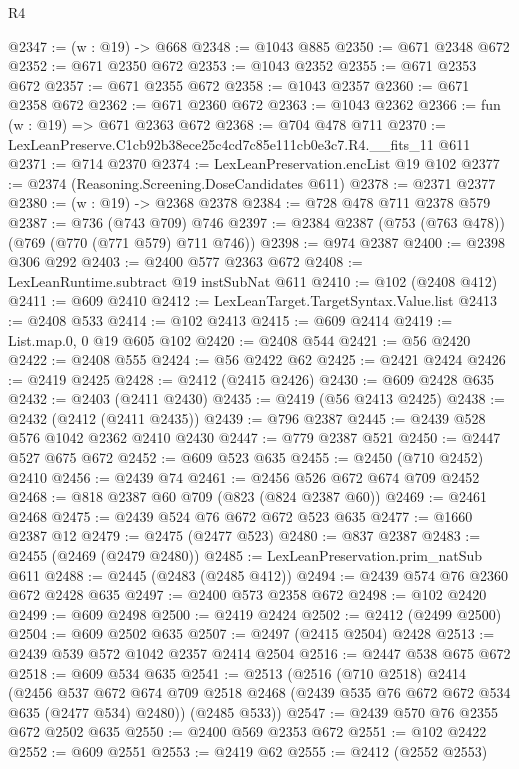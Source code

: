 \begin{lexlean}{R4}
\begin{coremodule}
@2347 := (w : @19) -> @668
@2348 := @1043 @885
@2350 := @671 @2348 @672
@2352 := @671 @2350 @672
@2353 := @1043 @2352
@2355 := @671 @2353 @672
@2357 := @671 @2355 @672
@2358 := @1043 @2357
@2360 := @671 @2358 @672
@2362 := @671 @2360 @672
@2363 := @1043 @2362
@2366 := fun (w : @19) => @671 @2363 @672
@2368 := @704 @478 @711
@2370 := LexLeanPreserve.C1cb92b38ece25c4cd7c85e111cb0e3c7.R4.__fits_11 @611
@2371 := @714 @2370
@2374 := LexLeanPreservation.encList @19 @102
@2377 := @2374 (Reasoning.Screening.DoseCandidates @611)
@2378 := @2371 @2377
@2380 := (w : @19) -> @2368 @2378
@2384 := @728 @478 @711 @2378 @579
@2387 := @736 (@743 @709) @746
@2397 := @2384 @2387 (@753 (@763 @478)) (@769 (@770 (@771 @579) @711 @746))
@2398 := @974 @2387
@2400 := @2398 @306 @292
@2403 := @2400 @577 @2363 @672
@2408 := LexLeanRuntime.subtract @19 instSubNat @611
@2410 := @102 (@2408 @412)
@2411 := @609 @2410
@2412 := LexLeanTarget.TargetSyntax.Value.list
@2413 := @2408 @533
@2414 := @102 @2413
@2415 := @609 @2414
@2419 := List.map.{0, 0} @19 @605 @102
@2420 := @2408 @544
@2421 := @56 @2420
@2422 := @2408 @555
@2424 := @56 @2422 @62
@2425 := @2421 @2424
@2426 := @2419 @2425
@2428 := @2412 (@2415 @2426)
@2430 := @609 @2428 @635
@2432 := @2403 (@2411 @2430)
@2435 := @2419 (@56 @2413 @2425)
@2438 := @2432 (@2412 (@2411 @2435))
@2439 := @796 @2387
@2445 := @2439 @528 @576 @1042 @2362 @2410 @2430
@2447 := @779 @2387 @521
@2450 := @2447 @527 @675 @672
@2452 := @609 @523 @635
@2455 := @2450 (@710 @2452) @2410
@2456 := @2439 @74
@2461 := @2456 @526 @672 @674 @709 @2452
@2468 := @818 @2387 @60 @709 (@823 (@824 @2387 @60))
@2469 := @2461 @2468
@2475 := @2439 @524 @76 @672 @672 @523 @635
@2477 := @1660 @2387 @12
@2479 := @2475 (@2477 @523)
@2480 := @837 @2387
@2483 := @2455 (@2469 (@2479 @2480))
@2485 := LexLeanPreservation.prim_natSub @611
@2488 := @2445 (@2483 (@2485 @412))
@2494 := @2439 @574 @76 @2360 @672 @2428 @635
@2497 := @2400 @573 @2358 @672
@2498 := @102 @2420
@2499 := @609 @2498
@2500 := @2419 @2424
@2502 := @2412 (@2499 @2500)
@2504 := @609 @2502 @635
@2507 := @2497 (@2415 @2504) @2428
@2513 := @2439 @539 @572 @1042 @2357 @2414 @2504
@2516 := @2447 @538 @675 @672
@2518 := @609 @534 @635
@2541 := @2513
    (@2516
      (@710 @2518)
      @2414
      (@2456
        @537
        @672
        @674
        @709
        @2518
        @2468
        (@2439 @535 @76 @672 @672 @534 @635 (@2477 @534) @2480))
      (@2485 @533))
@2547 := @2439 @570 @76 @2355 @672 @2502 @635
@2550 := @2400 @569 @2353 @672
@2551 := @102 @2422
@2552 := @609 @2551
@2553 := @2419 @62
@2555 := @2412 (@2552 @2553)

\end{coremodule}
\end{lexlean}
